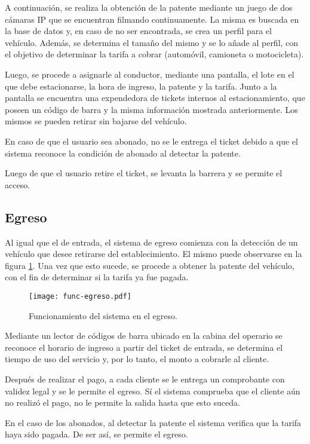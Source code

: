 A continuación, se realiza la obtención de la patente mediante un juego de dos cámaras IP que se encuentran filmando continuamente. La misma es buscada en la base de datos y, en caso de no ser encontrada, se crea un perfil para el vehículo. Además, se determina el tamaño del mismo y se lo añade al perfil, con el objetivo de determinar la tarifa a cobrar (automóvil, camioneta o motocicleta). 

Luego, se procede a asignarle al conductor, mediante una pantalla, el lote en el que debe estacionarse, la hora de ingreso, la patente y la tarifa. Junto a la pantalla se encuentra una expendedora de tickets internos al estacionamiento, que poseen un código de barra y la misma información mostrada anteriormente. Los mismos se pueden retirar sin bajarse del vehículo. 

En caso de que el usuario sea abonado, no se le entrega el ticket debido a que el sistema reconoce la condición de abonado al detectar la patente.

Luego de que el usuario retire el ticket, se levanta la barrera y se permite el acceso. 


\subsection{Egreso}

Al igual que el de entrada, el sistema de egreso comienza con la detección de un vehículo que desee retirarse del establecimiento. El mismo puede observarse en la figura \ref{fig:img_egreso}. Una vez que esto sucede, se procede a obtener la patente del vehículo, con el fin de determinar si la tarifa ya fue pagada.

\begin{figure}[H]
	\centering
	\texttt{[image: func-egreso.pdf]}
	\caption{Funcionamiento del sistema en el egreso.}
	\label{fig:img_egreso}
\end{figure}

Mediante un lector de códigos de barra ubicado en la cabina del operario se reconoce el horario de ingreso a partir del ticket de entrada, se determina el tiempo de uso del servicio y, por lo tanto, el monto a cobrarle al cliente.

Después de realizar el pago, a cada cliente se le entrega un comprobante con validez legal y se le permite el egreso. Sí el sistema comprueba que el cliente aún no realizó el pago, no le permite la salida hasta que esto suceda.

En el caso de los abonados, al detectar la patente el sistema verifica que la tarifa haya sido pagada. De ser así, se permite el egreso.

